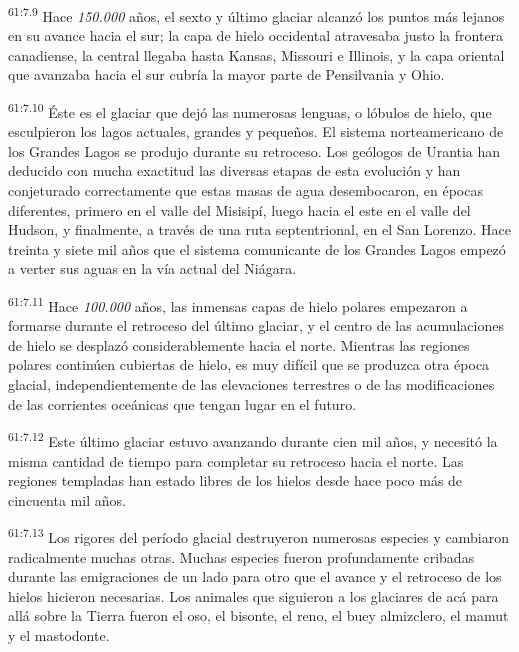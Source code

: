 \par
\textsuperscript{61:7.9} Hace \textit{150.000} años, el sexto y último glaciar alcanzó los puntos más lejanos en su avance hacia el sur; la capa de hielo occidental atravesaba justo la frontera canadiense, la central llegaba hasta Kansas, Missouri e Illinois, y la capa oriental que avanzaba hacia el sur cubría la mayor parte de Pensilvania y Ohio.

\par
\textsuperscript{61:7.10} Éste es el glaciar que dejó las numerosas lenguas, o lóbulos de hielo, que esculpieron los lagos actuales, grandes y pequeños. El sistema norteamericano de los Grandes Lagos se produjo durante su retroceso. Los geólogos de Urantia han deducido con mucha exactitud las diversas etapas de esta evolución y han conjeturado correctamente que estas masas de agua desembocaron, en épocas diferentes, primero en el valle del Misisipí, luego hacia el este en el valle del Hudson, y finalmente, a través de una ruta septentrional, en el San Lorenzo. Hace treinta y siete mil años que el sistema comunicante de los Grandes Lagos empezó a verter sus aguas en la vía actual del Niágara.

\par
\textsuperscript{61:7.11} Hace \textit{100.000} años, las inmensas capas de hielo polares empezaron a formarse durante el retroceso del último glaciar, y el centro de las acumulaciones de hielo se desplazó considerablemente hacia el norte. Mientras las regiones polares continúen cubiertas de hielo, es muy difícil que se produzca otra época glacial, independientemente de las elevaciones terrestres o de las modificaciones de las corrientes oceánicas que tengan lugar en el futuro.

\par
\textsuperscript{61:7.12} Este último glaciar estuvo avanzando durante cien mil años, y necesitó la misma cantidad de tiempo para completar su retroceso hacia el norte. Las regiones templadas han estado libres de los hielos desde hace poco más de cincuenta mil años.

\par
\textsuperscript{61:7.13} Los rigores del período glacial destruyeron numerosas especies y cambiaron radicalmente muchas otras. Muchas especies fueron profundamente cribadas durante las emigraciones de un lado para otro que el avance y el retroceso de los hielos hicieron necesarias. Los animales que siguieron a los glaciares de acá para allá sobre la Tierra fueron el oso, el bisonte, el reno, el buey almizclero, el mamut y el mastodonte.

